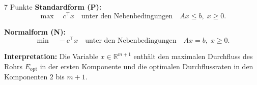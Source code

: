 \documentclass{problemset}
\begin{document}
\begin{problem}{7 Punkte}
\textbf{Standardform (P):}
\[
    \max \quad c^\top x \quad \text{unter den Nebenbedingungen} \quad A x \leq b, \; x \geq 0.
\]

\textbf{Normalform (N):}
\[
    \min \quad -c^\top x \quad \text{unter den Nebenbedingungen} \quad A x = b, \; x \geq 0.
\]

\textbf{Interpretation:}
Die Variable \( x \in \mathbb{R}^{m+1} \) enthält den maximalen Durchfluss des
Rohrs \( E_{\text{opt}} \) in der ersten Komponente und die optimalen
Durchflussraten in den Komponenten \( 2 \) bis \( m+1 \).
\end{problem}
\end{document}
